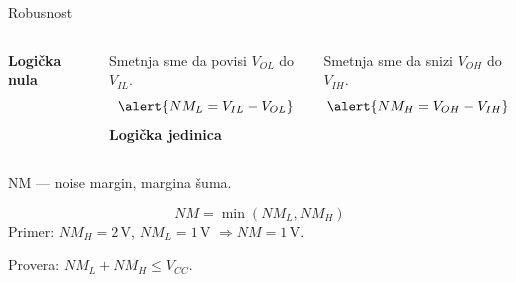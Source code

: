 \begin{frame}[label=08-s014]{Robusnost}
\begin{columns}[T,onlytextwidth]
\textbf{Logička nula}\par\medskip
Smetnja sme da povisi $V_{OL}$ do $V_{IL}$.
\[\alert{NM_L=V_{IL}-V_{OL}}\]
\textbf{Logička jedinica}\par\medskip
Smetnja sme da snizi $V_{OH}$ do $V_{IH}$.
\[\alert{NM_H=V_{OH}-V_{IH}}\]
\end{columns}\medskip
NM — noise margin, margina šuma.\par\medskip
\[NM=\min(NM_L,NM_H)\]
Primer: $NM_H=2\,\mathrm V$, $NM_L=1\,\mathrm V$ $\Rightarrow NM=1\,\mathrm V$.\par\medskip
Provera: $NM_L+NM_H\leq V_{CC}$.
\end{frame}
